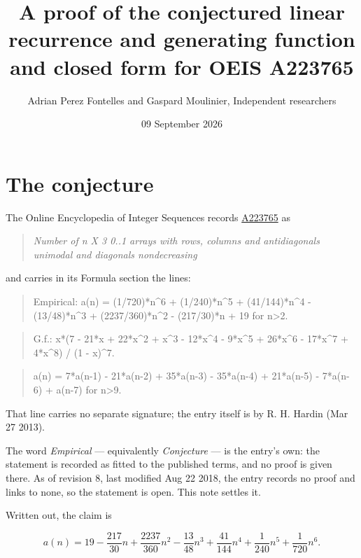 \documentclass[11pt]{article}
\title{A proof of the conjectured linear recurrence and generating function and closed form for OEIS A223765}
\author{Adrian Perez Fontelles and Gaspard Moulinier, Independent researchers}
\date{09 September 2026}
\theoremstyle{definition}
\begin{document}
\maketitle
\section{The conjecture}

The Online Encyclopedia of Integer Sequences records \href{https://oeis.org/A223765}{A223765} as

\begin{quote}\itshape Number of n X 3 0..1 arrays with rows, columns and antidiagonals unimodal and diagonals nondecreasing\end{quote}

and carries in its Formula section the lines:

\begin{quote}\ttfamily Empirical: a(n) = (1/720)*n\textasciicircum{}6 + (1/240)*n\textasciicircum{}5 + (41/144)*n\textasciicircum{}4 - (13/48)*n\textasciicircum{}3 + (2237/360)*n\textasciicircum{}2 - (217/30)*n + 19 for n>2.\end{quote}

\begin{quote}\ttfamily G.f.: x*(7 - 21*x + 22*x\textasciicircum{}2 + x\textasciicircum{}3 - 12*x\textasciicircum{}4 - 9*x\textasciicircum{}5 + 26*x\textasciicircum{}6 - 17*x\textasciicircum{}7 + 4*x\textasciicircum{}8) / (1 - x)\textasciicircum{}7.\end{quote}

\begin{quote}\ttfamily a(n) = 7*a(n-1) - 21*a(n-2) + 35*a(n-3) - 35*a(n-4) + 21*a(n-5) - 7*a(n-6) + a(n-7) for n>9.\end{quote}

That line carries no separate signature; the entry itself is by R. H. Hardin (Mar 27 2013).

The word {\itshape Empirical} --- equivalently {\itshape Conjecture} --- is the entry's own: the statement is recorded as fitted to the published terms, and no proof is given there. As of revision 8, last modified Aug 22 2018, the entry records no proof and links to none, so the statement is open. This note settles it.

Written out, the claim is

\[a(n) = 19 - \frac{217}{30}n + \frac{2237}{360}n^{2} - \frac{13}{48}n^{3} + \frac{41}{144}n^{4} + \frac{1}{240}n^{5} + \frac{1}{720}n^{6}.\]
\end{document}
